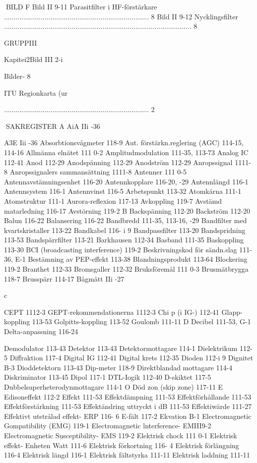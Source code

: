 BILD F
Bild II 9-11 Parasitfilter i HF-förstärkare ........................................................................... 8
Bild II 9-12 Nycklingsfilter ................................................................................................. 8

GRUPPIII

Kapitei2Bild III 2-i

Bilder- 8

ITU Regionkarta (ur

........................................................................... 2

SAKREGISTER
A
AiA IIi -36

A3E Iii -36
Absorbtionsvågmeter 118-9
Aut. förstärkn.reglering (AGC) 114-15, 114-16
Allmänna elnätet 111 0-2
Amplitudmodulation 111-35, 113-73
Analog IC 112-41
Anod 112-29
Anodspänning 112-29
Anodström 112-29
Anropssignal 1111-8
Anropssignalers sammansättning 1111-8
Antenner 111 0-5
Antennavstämningsenhet 116-20
Antennkopplare 116-20, -29
Antennlängd 116-1
Antennsystem 116-1
Antennvinst 116-5
Arbetspunkt 113-32
Atomkärna 111-1
Atomstruktur 111-1
Aurora-reflexion 117-13
Avkoppling 119-7
Avstämd matarledning 116-17
Avstörning 119-2
B
Backspänning 112-20
Backström 112-20
Balun 116-22
Balansering 116-22
Bandbredd 111-35, 113-16, -29
Bandfilter med kvartskristaller 113-22
Bandkabel 116- i 9
Bandpassfilter 113-20
Bandspridning 113-53
Bandspärrfilter 113-21
Barkhausen 112-34
Basband 111-35
Baskoppling 113-30
BCI (broadcasting interference) 119-2
Beskrivningskod för sändn.slag 111-36, E-1
Bestämning av PEP-effekt 113-38
Blandningsprodukt 113-64
Blockering 119-2
Branthet 112-33
Bromsgaller 112-32
Bruksföremål 111 0-3
Brusmätbrygga 118-7
Brusspärr 114-17
Bågmått IIi -27

c

CEPT 1112-3
GEPT-rekommendationerna 1112-3
Chi p (i IG-) 112-41
Glapp-koppling 113-53
Golpitts-koppling 113-52
Goulomb 111-11
D
Decibel 111-53, G-1
Delta-anpassning 116-24

Demodulator 113-43
Detektor 113-43
Detektormottagare 114-1
Dielektrikum 112-5
Diffraktion 117-4
Digital IG 112-41
Digital krets 112-35
Dioden 112-i 9
Dignitet B-3
Dioddetektorn 113-43
Dip-meter 118-9
Direktblandad mottagare 114-4
Diskriminator 113-45
Dipol 117-1
DTL-Iogik 112-40
D-skiktet 117-5
Dubbelsuperheterodynmottagare 114-1 O
Död zon (skip zone) 117-11
E
Edisoneffekt 112-2
Effekt 111-53
Effektdämpning 111-53
Effektförhållande 111-53
Effektförstärkning 111-53
Effektändring uttryckt i dB 111-53
Effektiwärde 111-27
Effektivt utstrålad effekt- ERP 116- 6
E-fält 117-2
Ekvation B-1
Electromagnetic Gompatibility (EMG) 119-1
Electromagnetic lnterference- EMIII9-2
Electromagnetic Susceptibility- EMS 119-2
Elektrisk chock 111 0-1
Elektrisk effekt- Enheten Watt 111-6
Elektrisk förkortning 116- 4
Elektrisk förlängning 116-4
Elektrisk längd 116-1
Elektrisk fältstyrka 111-11
Elektrisk laddning 111-11

